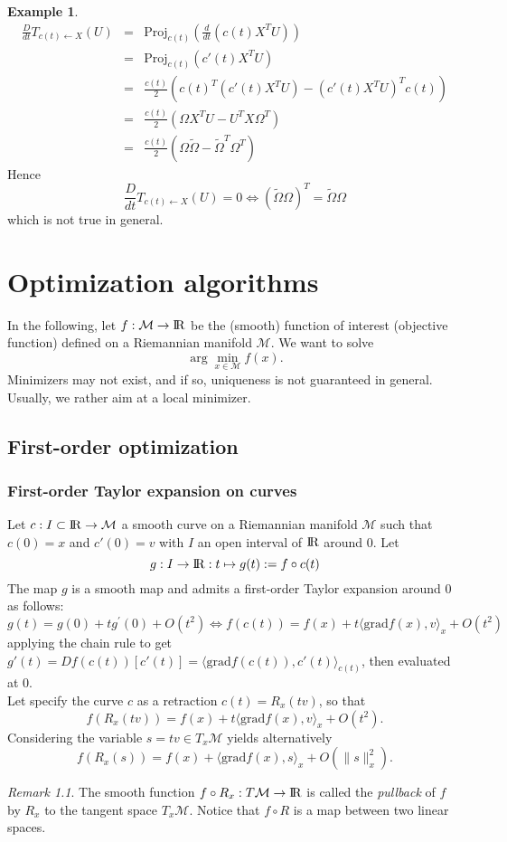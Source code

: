 \documentclass[10pt,a4paper]{book}
\theoremstyle{definition}
\newtheorem{exm}{Example}[section]
\theoremstyle{plain}
\theoremstyle{remark}
\newtheorem{rmk}{Remark}[section]
\newcommand{\grad}{\textrm{grad}}
\newcommand \M {\mathcal{M}}
\def\R{{\rm I\kern-0.16em R}}
\begin{document}
\begin{exm}
\begin{eqnarray*}
\frac{D}{dt}T_{c(t)\leftarrow X}(U)&=&\text{Proj}_{c(t)}\left(\frac{d}{dt}(c(t)X^{T}U)\right)\\
&=&\text{Proj}_{c(t)}(c'(t)X^TU)\\
&=&\frac{c(t)}{2}(c(t)^T(c'(t)X^TU)-(c'(t)X^TU)^Tc(t))\\
&=&\frac{c(t)}{2}(\Omega X^TU-U^TX\Omega^T)\\
&=&\frac{c(t)}{2}(\Omega \tilde{\Omega}-\tilde{\Omega}^T\Omega^T)
\end{eqnarray*}
Hence
$$\frac{D}{dt}T_{c(t)\leftarrow X}(U)= 0 \iff (\tilde{\Omega}\Omega)^T=\tilde{\Omega}\Omega$$
which is not true in general.
\end{exm}


\chapter{Optimization algorithms}
In the following, let $f: \M \to \R$ be the (smooth) function of interest (objective function) defined on a Riemannian manifold $\M$. We want to solve
$$\arg \min_{x\in \M}f(x).$$
Minimizers may not exist, and if so, uniqueness is not guaranteed in general. Usually, we rather aim at a local minimizer.
\section{First-order optimization}
\subsection{First-order Taylor expansion on curves}
Let $c:I\subset \R\to \M$ a smooth curve on a Riemannian manifold $\M$ such that $c(0)=x$ and $c'(0)=v$ with $I$ an open interval of $\R$ around 0. Let
$$g:I\to \R: t \mapsto g(t):=f\circ c(t)$$
The map $g$ is a smooth map  and admits a first-order Taylor expansion around 0 as follows:
$$g(t)=g(0)+tg^{\prime}(0)+O(t^2) \iff f(c(t))=f(x)+t\langle \grad f(x),v\rangle_x+O(t^2)$$
applying the chain rule to get
$g'(t)=Df(c(t))[c'(t)]=\langle \grad f(c(t)),c'(t)\rangle_{c(t)}$, then evaluated at 0.
\\ Let specify the curve $c$ as a retraction $c(t)=R_x(tv)$, so that
$$f(R_x(tv))=f(x)+t\langle \grad f(x),v\rangle_x+O(t^2).$$
Considering the variable $s=tv\in T_x\M$ yields alternatively
$$f(R_x(s))=f(x)+\langle \grad f(x),s\rangle_x+O(\|s\|^2_{x}).$$
\begin{rmk}
The smooth function $f\circ R_x: T\M \to \R$ is called the \emph{pullback} of $f$ by $R_x$ to the tangent space $T_x\M$. Notice that $f\circ R$ is a map between two linear spaces.
\end{rmk}
\end{document}

